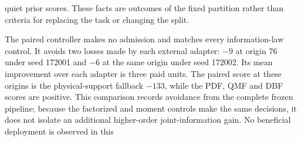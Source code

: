 quiet prior scores. These facts are outcomes of the fixed partition rather 
than criteria for replacing the task or changing the split.
\begin{table}[t]\centering\small
\caption{All nine locked mobile755 pipelines under budget 130. Returns are mean complete paid increments over five delay schedules; action and coverage counts pool those schedules descriptively. The last column is maximum optimistic excess on actual admissions.}
\label{tab:mobile755-complete}
\end{table}
The paired controller makes no admission and matches every information-law 
control. It avoids two losses made by each external adapter: $-9$ at origin 
76 under seed 172001 and $-6$ at the same origin under seed 172002. Its 
mean improvement over each adapter is three paid units. The paired score 
at these origins is the physical-support fallback $-133$, while the PDF, 
QMF and DBF scores are positive. This comparison records avoidance from 
the complete frozen pipeline; because the factorized and moment controls 
make the same decisions, it does not isolate an additional higher-order 
joint-information gain. No beneficial deployment is observed in this 
